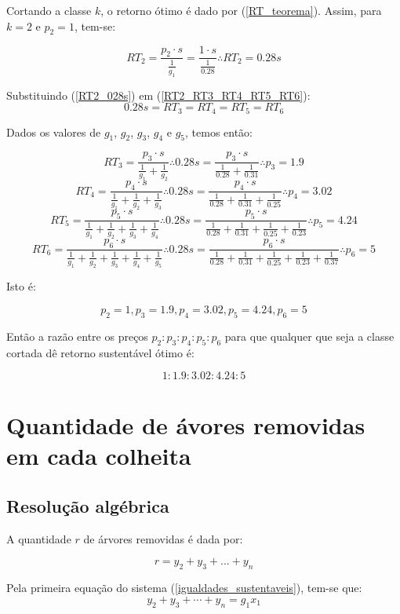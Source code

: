 \documentclass[a4paper, 12pt]{article}
\begin{document}
Cortando a classe $k$, o retorno ótimo é dado por (\ref{RT_teorema}). Assim, para $k=2$ e $p_2=1$, tem-se:

\begin{equation}\label{RT2_028s}
    RT_2=\frac{p_2\cdot s}{\frac{1}{g_1}}=\frac{1\cdot s}{\frac{1}{0.28}}\therefore RT_2=0.28s
\end{equation}

Substituindo (\ref{RT2_028s}) em (\ref{RT2_RT3_RT4_RT5_RT6}):
$$ 0.28s=RT_3=RT_4=RT_5=RT_6 $$

Dados os valores de $g_1$, $g_2$, $g_3$, $g_4$ e $g_5$, temos então:

$$RT_3=\frac{p_3\cdot s}{\frac{1}{g_1}+\frac{1}{g_2}}\therefore 0.28s=\frac{p_3\cdot s}{\frac{1}{0.28}+\frac{1}{0.31}}\therefore p_3=1.9$$
$$RT_4=\frac{p_4\cdot s}{\frac{1}{g_1}+\frac{1}{g_2}+\frac{1}{g_3}}\therefore 0.28s=\frac{p_4\cdot s}{\frac{1}{0.28}+\frac{1}{0.31}+\frac{1}{0.25}}\therefore p_4=3.02$$
$$RT_5=\frac{p_5\cdot s}{\frac{1}{g_1}+\frac{1}{g_2}+\frac{1}{g_3}+\frac{1}{g_4}}\therefore 0.28s=\frac{p_5\cdot s}{\frac{1}{0.28}+\frac{1}{0.31}+\frac{1}{0.25}+\frac{1}{0.23}}\therefore p_5=4.24$$
$$RT_6=\frac{p_6\cdot s}{\frac{1}{g_1}+\frac{1}{g_2}+\frac{1}{g_3}+\frac{1}{g_4}+\frac{1}{g_5}}\therefore 0.28s=\frac{p_6\cdot s}{\frac{1}{0.28}+\frac{1}{0.31}+\frac{1}{0.25}+\frac{1}{0.23}+\frac{1}{0.37}}\therefore p_6=5$$

Isto é:

$$p_2=1, p_3=1.9, p_4=3.02, p_5=4.24, p_6=5$$

Então a razão entre os preços $p_2:p_3:p_4:p_5:p_6$ para que qualquer que seja a classe cortada dê retorno sustentável ótimo é:

$$1:1.9:3.02:4.24:5$$

\section{Quantidade de ávores removidas em cada colheita}

\subsection{Resolução algébrica}

A quantidade $r$ de árvores removidas é dada por:

$$r=y_2+y_3+...+y_n$$

Pela primeira equação do sistema (\ref{igualdades_sustentaveis}), tem-se que:
$$y_2 + y_3 + \cdots + y_n = g_1 x_1$$
\end{document}
